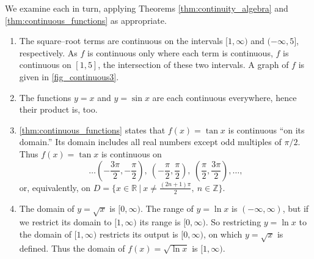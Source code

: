 {We examine each in turn, applying Theorems \ref{thm:continuity_algebra} and \ref{thm:continuous_functions} as appropriate.
\begin{enumerate}
	\item	The square--root terms are continuous on the intervals $[1,\infty)$ and $(-\infty,5]$, respectively. As $f$ is continuous only where each term is continuous, $f$ is continuous on $[1,5]$, the intersection of these two intervals. A graph of $f$ is given in \autoref{fig_continuous3}.

	\item	The functions $y=x$ and $y=\sin x$ are each continuous everywhere, hence their product is, too.
	\item	\autoref{thm:continuous_functions} states that $f(x) = \tan x$ is continuous ``on its domain.'' Its domain includes all real numbers except odd multiples of $\pi/2$. Thus $f(x) = \tan x$ is continuous on
	\[\ldots \left(-\frac{3\pi}{2},-\frac{\pi}2\right),\ \left(-\frac{\pi}2,\frac{\pi}2\right),\ \left(\frac{\pi}2,\frac{3\pi}2\right),\ldots,\]
	or, equivalently, on $D = \{x\in \mathbb{R}\ \vert\ x\neq \frac{(2n+1)\pi}2,\ n\in\mathbb{Z}\}$.
	\item	The domain of $y = \sqrt{x}$ is $[0,\infty)$. The range of $y=\ln x$ is $(-\infty,\infty)$, but if we restrict its domain to $[1,\infty)$ its range is $[0,\infty)$. So restricting $y = \ln x$ to the domain of $[1,\infty)$ restricts its output is $[0,\infty)$, on which $y = \sqrt{x}$ is defined. Thus the domain of $f(x) = \sqrt{\ln x}$ is $[1,\infty)$.\eoehere
\end{enumerate}}

